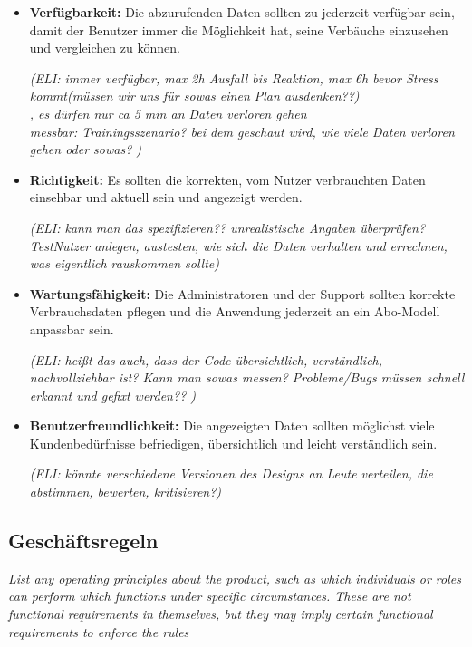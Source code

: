 
\begin{itemize}
    \item \textbf{Verfügbarkeit: }
    Die abzurufenden Daten sollten zu jederzeit verfügbar sein,
    damit der Benutzer immer die Möglichkeit hat, 
    seine Verbäuche einzusehen und vergleichen zu können.
    
    \textit{(ELI: immer verfügbar, max 2h Ausfall bis Reaktion, 
    max 6h bevor Stress kommt(müssen wir uns für sowas einen Plan ausdenken??)\\,
    es dürfen nur ca 5 min an Daten verloren gehen\\
    messbar: Trainingsszenario? bei dem geschaut wird, 
    wie viele Daten verloren gehen oder sowas? )}
    
    \item \textbf{Richtigkeit: }
    Es sollten die korrekten, 
    vom Nutzer verbrauchten Daten einsehbar und 
    aktuell sein und angezeigt werden.

\textit{(ELI: kann man das spezifizieren?? unrealistische Angaben überprüfen?
\\TestNutzer anlegen, austesten, 
    wie sich die Daten verhalten und errechnen, 
    was eigentlich rauskommen sollte)}
    \item \textbf{Wartungsfähigkeit: }
    Die Administratoren und der Support sollten korrekte Verbrauchsdaten 
    pflegen und die Anwendung jederzeit an ein Abo-Modell anpassbar sein.

    \textit{(ELI: heißt das auch, dass der Code übersichtlich, verständlich, 
    nachvollziehbar ist? Kann man sowas messen?
    Probleme/Bugs müssen schnell erkannt und gefixt werden?? )}

    \item \textbf{Benutzerfreundlichkeit: }
    Die angezeigten Daten sollten möglichst viele Kundenbedürfnisse 
    befriedigen, übersichtlich und leicht verständlich sein.

    \textit{(ELI: könnte verschiedene Versionen des Designs an 
    Leute verteilen, die abstimmen, bewerten, kritisieren?)}
\end{itemize}

\subsection{Geschäftsregeln}
\textit{List any operating principles about the product, 
such as which individuals or roles can perform which functions under specific circumstances. 
These are not functional requirements in themselves, 
but they may imply certain functional requirements to enforce the rules}
